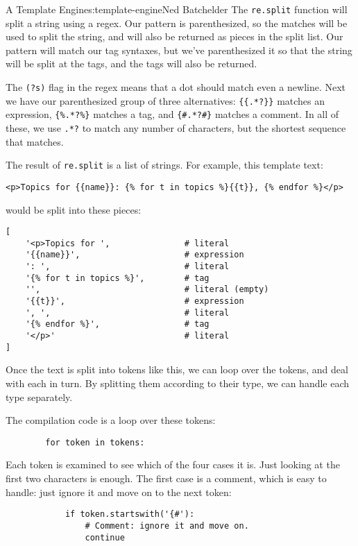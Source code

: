 \begin{aosachapter}{A Template Engine}{s:template-engine}{Ned Batchelder}
The \texttt{re.split} function will split a string using a regex. Our
pattern is parenthesized, so the matches will be used to split the
string, and will also be returned as pieces in the split list. Our
pattern will match our tag syntaxes, but we've parenthesized it so that
the string will be split at the tags, and the tags will also be
returned.

The \texttt{(?s)} flag in the regex means that a dot should match even a
newline. Next we have our parenthesized group of three alternatives:
\texttt{\{\{.*?\}\}} matches an expression, \texttt{\{\%.*?\%\}} matches
a tag, and \texttt{\{\#.*?\#\}} matches a comment. In all of these, we
use \texttt{.*?} to match any number of characters, but the shortest
sequence that matches.

The result of \texttt{re.split} is a list of strings. For example, this
template text:

\begin{verbatim}
<p>Topics for {{name}}: {% for t in topics %}{{t}}, {% endfor %}</p>
\end{verbatim}

would be split into these pieces:

\begin{verbatim}
[
    '<p>Topics for ',               # literal
    '{{name}}',                     # expression
    ': ',                           # literal
    '{% for t in topics %}',        # tag
    '',                             # literal (empty)
    '{{t}}',                        # expression
    ', ',                           # literal
    '{% endfor %}',                 # tag
    '</p>'                          # literal
]
\end{verbatim}

Once the text is split into tokens like this, we can loop over the
tokens, and deal with each in turn. By splitting them according to their
type, we can handle each type separately.

The compilation code is a loop over these tokens:

\begin{verbatim}
        for token in tokens:
\end{verbatim}

Each token is examined to see which of the four cases it is. Just
looking at the first two characters is enough. The first case is a
comment, which is easy to handle: just ignore it and move on to the next
token:

\begin{verbatim}
            if token.startswith('{#'):
                # Comment: ignore it and move on.
                continue
\end{verbatim}


\end{aosachapter}
